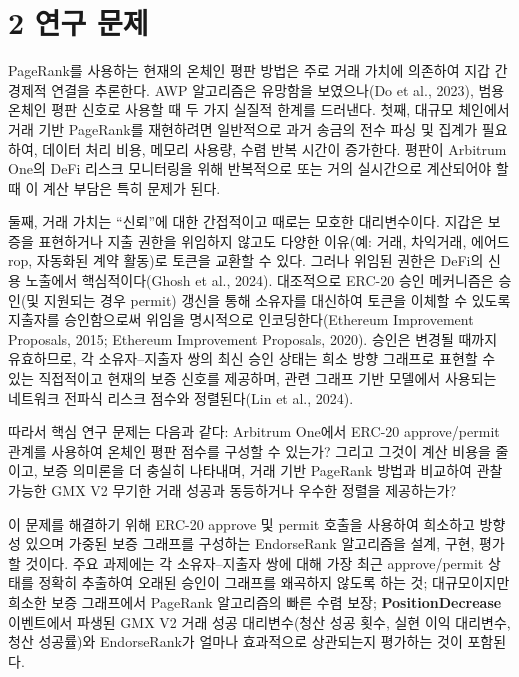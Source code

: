 \clearpage
{}
\section*{2 \textbf{연구 문제}}
\label{sec:research-problem}

PageRank를 사용하는 현재의 온체인 평판 방법은 주로 거래 가치에 의존하여 지갑 간 경제적 연결을 추론한다. AWP 알고리즘은 유망함을 보였으나(Do et al., 2023), 범용 온체인 평판 신호로 사용할 때 두 가지 실질적 한계를 드러낸다. 첫째, 대규모 체인에서 거래 기반 PageRank를 재현하려면 일반적으로 과거 송금의 전수 파싱 및 집계가 필요하여, 데이터 처리 비용, 메모리 사용량, 수렴 반복 시간이 증가한다. 평판이 Arbitrum One의 DeFi 리스크 모니터링을 위해 반복적으로 또는 거의 실시간으로 계산되어야 할 때 이 계산 부담은 특히 문제가 된다.


둘째, 거래 가치는 ``신뢰''에 대한 간접적이고 때로는 모호한 대리변수이다. 지갑은 보증을 표현하거나 지출 권한을 위임하지 않고도 다양한 이유(예: 거래, 차익거래, 에어드rop, 자동화된 계약 활동)로 토큰을 교환할 수 있다. 그러나 위임된 권한은 DeFi의 신용 노출에서 핵심적이다(Ghosh et al., 2024). 대조적으로 ERC-20 승인 메커니즘은 승인(및 지원되는 경우 permit) 갱신을 통해 소유자를 대신하여 토큰을 이체할 수 있도록 지출자를 승인함으로써 위임을 명시적으로 인코딩한다(Ethereum Improvement Proposals, 2015; Ethereum Improvement Proposals, 2020). 승인은 변경될 때까지 유효하므로, 각 소유자--지출자 쌍의 최신 승인 상태는 희소 방향 그래프로 표현할 수 있는 직접적이고 현재의 보증 신호를 제공하며, 관련 그래프 기반 모델에서 사용되는 네트워크 전파식 리스크 점수와 정렬된다(Lin et al., 2024).


따라서 핵심 연구 문제는 다음과 같다: Arbitrum One에서 ERC-20 approve/permit 관계를 사용하여 온체인 평판 점수를 구성할 수 있는가? 그리고 그것이 계산 비용을 줄이고, 보증 의미론을 더 충실히 나타내며, 거래 기반 PageRank 방법과 비교하여 관찰 가능한 GMX V2 무기한 거래 성공과 동등하거나 우수한 정렬을 제공하는가?


이 문제를 해결하기 위해 ERC-20 approve 및 permit 호출을 사용하여 희소하고 방향성 있으며 가중된 보증 그래프를 구성하는 EndorseRank 알고리즘을 설계, 구현, 평가할 것이다. 주요 과제에는 각 소유자--지출자 쌍에 대해 가장 최근 approve/permit 상태를 정확히 추출하여 오래된 승인이 그래프를 왜곡하지 않도록 하는 것; 대규모이지만 희소한 보증 그래프에서 PageRank 알고리즘의 빠른 수렴 보장; \textbf{PositionDecrease} 이벤트에서 파생된 GMX V2 거래 성공 대리변수(청산 성공 횟수, 실현 이익 대리변수, 청산 성공률)와 EndorseRank가 얼마나 효과적으로 상관되는지 평가하는 것이 포함된다.


